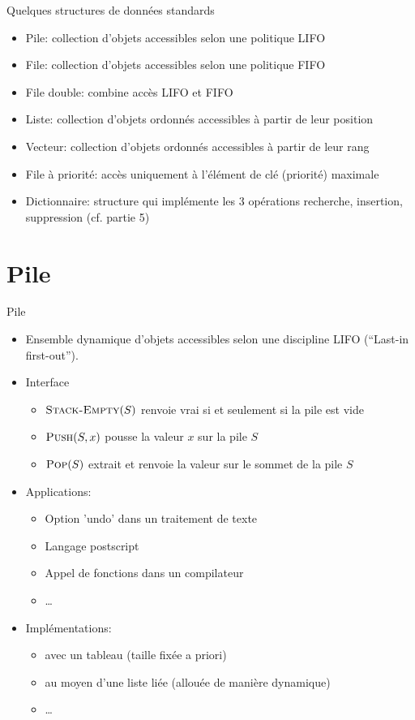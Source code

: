 \begin{frame}{Quelques structures de données standards}

\begin{itemize}
\item Pile: collection d'objets accessibles selon une politique LIFO
\item File: collection d'objets accessibles selon une politique FIFO
\item File double: combine accès LIFO et FIFO
\item Liste: collection d'objets ordonnés accessibles à partir de leur position
\item Vecteur: collection d'objets ordonnés accessibles à partir de leur rang
\item File à priorité: accès uniquement à l'élément de clé (priorité) maximale

\bigskip

\item Dictionnaire: structure qui implémente les 3 opérations
  recherche, insertion, suppression (cf. partie 5)
\end{itemize}

\end{frame}

\section{Pile}

\begin{frame}{Pile}
\begin{itemize}
\item Ensemble dynamique d'objets accessibles selon une discipline
  \alert{LIFO} (``Last-in first-out'').
\item Interface
\begin{itemize}
\item $\textnormal{\scshape Stack-Empty}(S)$ renvoie vrai si et seulement si la pile est vide
\item $\textnormal{\scshape Push}(S,x)$ pousse la valeur $x$ sur la pile $S$
\item $\textnormal{\scshape Pop}(S)$ extrait et renvoie la valeur sur le sommet de la pile $S$
\end{itemize}
\item Applications:
\begin{itemize}
\item Option 'undo' dans un traitement de texte
\item Langage postscript
\item Appel de fonctions dans un compilateur
\item \ldots
\end{itemize}
\item Implémentations:
\begin{itemize}
\item avec un tableau (taille fixée a priori)
\item au moyen d'une liste liée (allouée de manière dynamique)
\item \ldots
\end{itemize}
\end{itemize}
\end{frame}

